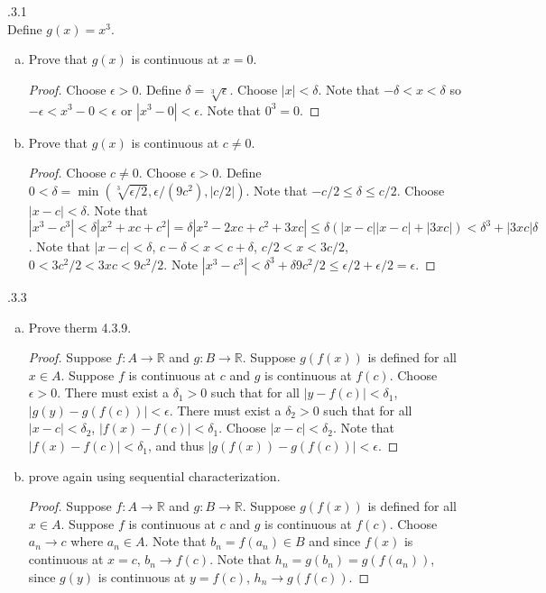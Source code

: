 \documentclass[12pt]{article}
\makeatletter
\theoremstyle{homework}
\newenvironment{exercise}[1]
{\def\@currentlabel{#1}\exercisecore}
{\endexercisecore}
\makeatother
\begin{document}
\begin{exercise}

4.3.1 \\
Define $g(x)=x^3$.
\end{exercise}
\begin{enumerate}[(a)]
\item
Prove that $g(x)$ is continuous at $x=0$.
\begin{proof}
Choose $\epsilon>0$.  Define $\delta=\sqrt[3]{\epsilon}$.  Choose $|x|<\delta$.  Note that $-\delta<x<\delta$ so $-\epsilon<x^3-0<\epsilon$ or $|x^3-0|<\epsilon$.  Note that $0^3=0$.
\end{proof}
\item
Prove that $g(x)$ is continuous at $c\neq 0$.
\begin{proof}
Choose $c\neq 0$.  Choose $\epsilon>0$.  Define $0<\delta=\min(\sqrt[3]{\epsilon/2},\epsilon/(9c^2),|c/2|)$.  Note that $-c/2 \leq \delta\leq c/2$.  Choose $|x-c|<\delta$.  Note that $|x^3-c^3|<\delta|x^2+xc+c^2|=\delta|x^2-2xc+c^2+3xc|\leq\delta(|x-c||x-c|+|3xc|)<\delta^3+|3xc|\delta$.  Note that $|x-c|<\delta$, $c-\delta<x<c+\delta$, $c/2<x<3c/2$, $0<3c^2/2<3xc<9c^2/2$.  Note $|x^3-c^3|<\delta^3+\delta9c^2/2\leq \epsilon/2+\epsilon/2=\epsilon$.
\end{proof}
\end{enumerate}
\begin{exercise}

4.3.3 \\
\end{exercise}
\begin{enumerate}[(a)]
\item
Prove therm 4.3.9.\\
\begin{proof}
Suppose $f:A\rightarrow \mathbb{R}$ and $g:B\rightarrow \mathbb{R}$.  Suppose $g(f(x))$ is defined for all $x\in A$.  Suppose $f$ is continuous at $c$ and $g$ is continuous at $f(c)$.  Choose $\epsilon>0$.  There must exist a $\delta_1>0$ such that for all $|y-f(c)|<\delta_1$, $|g(y)-g(f(c))|<\epsilon$.  There must exist a $\delta_2>0$ such that for all $|x-c|<\delta_2$, $|f(x)-f(c)|<\delta_1$.  Choose $|x-c|<\delta_2$.  Note that $|f(x)-f(c)|<\delta_1$, and thus $|g(f(x))-g(f(c))|<\epsilon$.
\end{proof}
\item
prove again using sequential characterization.
\begin{proof}
Suppose $f:A\rightarrow \mathbb{R}$ and $g:B\rightarrow \mathbb{R}$.  Suppose $g(f(x))$ is defined for all $x\in A$.  Suppose $f$ is continuous at $c$ and $g$ is continuous at $f(c)$.  Choose $a_n\rightarrow c$ where $a_n\in A$.  Note that $b_n=f(a_n)\in B$ and since $f(x)$ is continuous at $x=c$, $b_n\rightarrow f(c)$.  Note that $h_n=g(b_n)=g(f(a_n))$, since $g(y)$ is continuous at $y=f(c)$, $h_n\rightarrow g(f(c))$.

\end{proof}
\end{enumerate}
\end{document}
